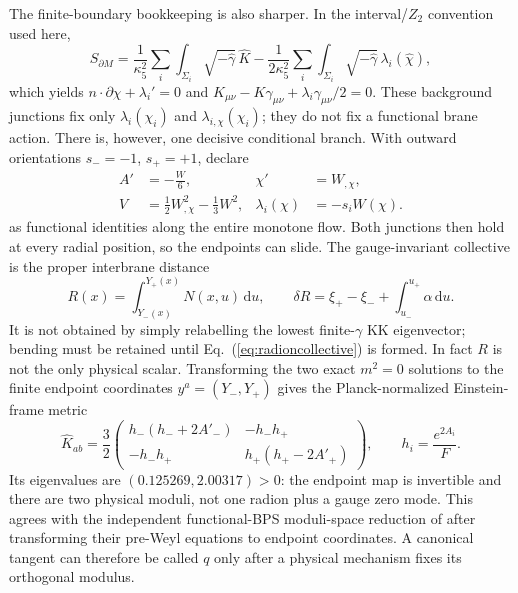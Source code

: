 \documentclass[10pt]{article}
\newcommand{\dd}{\mathrm{d}}
\begin{document}
The finite-boundary bookkeeping is also sharper.  In the interval/$Z_2$
convention used here,
\begin{equation}
 S_{\partial M}=\frac1{\kappa_5^2}\sum_i\int_{\Sigma_i}
 \sqrt{-\hat\gamma}\,\hat K
 -\frac1{2\kappa_5^2}\sum_i\int_{\Sigma_i}
 \sqrt{-\hat\gamma}\,\lambda_i(\hat\chi),
 \label{eq:compactboundaryaction}
\end{equation}
which yields $n\cdot\partial\chi+\lambda_i'=0$ and
$K_{\mu\nu}-K\gamma_{\mu\nu}+\lambda_i\gamma_{\mu\nu}/2=0$.
These background junctions fix only $\lambda_i(\chi_i)$ and
$\lambda_{i,\chi}(\chi_i)$; they do not fix a functional brane action.  There
is, however, one decisive conditional branch.  With outward orientations
$s_-= -1$, $s_+=+1$, declare
\begin{equation}
 \begin{aligned}
 A'&=-\frac W6,& \chi'&=W_{,\chi},\\
 V&=\frac12W_{,\chi}^2-\frac13W^2,&
 \lambda_i(\chi)&=-s_iW(\chi) .
 \end{aligned}
 \label{eq:functionalbpsbranes}
\end{equation}
as functional identities along the entire monotone flow.  Both junctions then
hold at every radial position, so the endpoints can slide.  The gauge-invariant
collective is the proper interbrane distance
\begin{equation}
 R(x)=\int_{Y_-(x)}^{Y_+(x)}N(x,u)\,\dd u,\qquad
 \delta R=\xi_+-\xi_-+\int_{u_-}^{u_+}\alpha\,\dd u .
 \label{eq:radioncollective}
\end{equation}
It is not obtained by simply relabelling the lowest finite-$\gamma$ KK
eigenvector; bending must be retained until Eq.~(\ref{eq:radioncollective}) is
formed.  In fact $R$ is not the only physical scalar.  Transforming the two
exact $m^2=0$ solutions to the finite endpoint coordinates
$y^a=(Y_-,Y_+)$ gives the Planck-normalized Einstein-frame metric
\begin{equation}
 \widehat K_{ab}=\frac32
 \begin{pmatrix}
 h_-(h_-+2A'_-)&-h_-h_+\\
 -h_-h_+&h_+(h_+-2A'_+)
 \end{pmatrix},\qquad h_i=\frac{e^{2A_i}}F .
 \label{eq:bpsmodulimatrix}
\end{equation}
Its eigenvalues are $(0.125269,2.00317)>0$: the endpoint map is invertible and
there are two physical moduli, not one radion plus a gauge zero mode.  This
agrees with the independent functional-BPS moduli-space reduction of
\citet{PalmaDavis2004} after transforming their pre-Weyl equations to endpoint
coordinates.  A canonical tangent can therefore be called $q$ only after a
physical mechanism fixes its orthogonal modulus.
\end{document}
